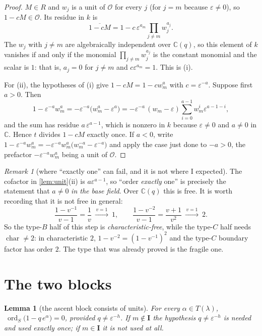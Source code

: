 \documentclass[11pt]{article}
\newtheorem{lem}[thm]{Lemma}
\theoremstyle{definition}
\theoremstyle{remark}
\newtheorem{rem}[thm]{Remark}
\DeclareMathOperator{\ord}{ord}
\newcommand{\bI}{\mathbf{I}}
\begin{document}
\begin{proof}
$M\in R$ and $w_j$ is a unit of $\mathcal{O}$ for every $j$ (for $j=m$ because
$\varepsilon\ne0$), so $1-cM\in\mathcal{O}$.  Its residue in $k$ is
\[
  \overline{1-cM}=1-c\,\varepsilon^{a_m}\prod_{j\ne m}w_j^{a_j}.
\]
The $w_j$ with $j\ne m$ are algebraically independent over $\mathbb{C}(q)$, so this
element of $k$ vanishes if and only if the monomial $\prod_{j\ne m}w_j^{a_j}$ is the
constant monomial and the scalar is $1$: that is, $a_j=0$ for $j\ne m$ and
$c\varepsilon^{a_m}=1$.  This is (i).

For (ii), the hypotheses of (i) give $1-cM=1-cw_m^{a}$ with $c=\varepsilon^{-a}$.
Suppose first $a>0$.  Then
\[
  1-\varepsilon^{-a}w_m^{a}
  =-\varepsilon^{-a}\bigl(w_m^{a}-\varepsilon^{a}\bigr)
  =-\varepsilon^{-a}\,(w_m-\varepsilon)\sum_{i=0}^{a-1}w_m^{i}\varepsilon^{a-1-i},
\]
and the sum has residue $a\,\varepsilon^{a-1}$, which is nonzero in $k$ because
$\varepsilon\ne0$ and $a\ne0$ in $\mathbb{C}$.  Hence $t$ divides $1-cM$ exactly once.
If $a<0$, write $1-\varepsilon^{-a}w_m^{a}=-\varepsilon^{-a}w_m^{a}
\bigl(w_m^{-a}-\varepsilon^{-a}\bigr)$ and apply the case just done to $-a>0$, the
prefactor $-\varepsilon^{-a}w_m^{a}$ being a unit of $\mathcal{O}$.
\end{proof}

\begin{rem}[where ``exactly one'' can fail, and it is not where I expected]
\label{rem:char}
The cofactor in \ref{lem:unit}(ii) is $a\varepsilon^{a-1}$, so ``order \emph{exactly}
one'' is precisely the statement that $a\ne0$ \emph{in the base field}.  Over
$\mathbb{C}(q)$ this is free.  It is worth recording that it is not free in general:
\[
  \frac{1-v^{-1}}{v-1}=\frac1v \ \xrightarrow{\,v=1\,}\ 1,
  \qquad
  \frac{1-v^{-2}}{v-1}=\frac{v+1}{v^{2}} \ \xrightarrow{\,v=1\,}\ 2 .
\]
So the type-$B$ half of this step is \emph{characteristic-free}, while the type-$C$ half
needs $\operatorname{char}\ne2$: in characteristic $2$, $1-v^{-2}=(1-v^{-1})^{2}$ and the
type-$C$ boundary factor has order $2$.  The type that was already proved is the
fragile one.
\end{rem}

\section{The two blocks}

\begin{lem}[the ascent block consists of units]\label{lem:T}
For every $\alpha\in T(\lambda)$, $\ \ord_S\bigl(1-q\,e^{\alpha}\bigr)=0$, provided
$q\ne\varepsilon^{-h}$.  If $m\notin\bI$ the hypothesis $q\ne\varepsilon^{-h}$ is needed
and used exactly once; if $m\in\bI$ it is not used at all.
\end{lem}
\end{document}
